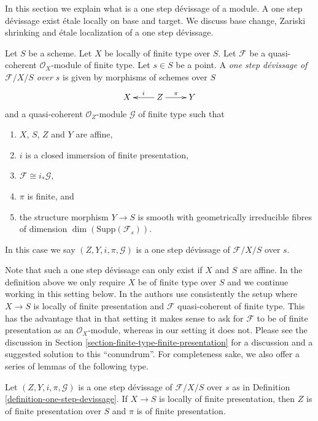 \noindent
In this section we explain what is a one step d\'evissage of a
module. A one step d\'evissage exist \'etale locally on base and target.
We discuss base change, Zariski shrinking and \'etale localization of
a one step d\'evissage.

\begin{definition}
\label{definition-one-step-devissage}
Let $S$ be a scheme.
Let $X$ be locally of finite type over $S$.
Let $\mathcal{F}$ be a quasi-coherent $\mathcal{O}_X$-module of finite type.
Let $s \in S$ be a point.
A {\it one step d\'evissage of $\mathcal{F}/X/S$ over $s$}
is given by morphisms of schemes over $S$
$$
\xymatrix{
X & Z \ar[l]_i \ar[r]^\pi & Y
}
$$
and a quasi-coherent $\mathcal{O}_Z$-module $\mathcal{G}$ of finite type
such that
\begin{enumerate}
\item $X$, $S$, $Z$ and $Y$ are affine,
\item $i$ is a closed immersion of finite presentation,
\item $\mathcal{F} \cong i_*\mathcal{G}$,
\item $\pi$ is finite, and
\item the structure morphism $Y \to S$ is smooth with
geometrically irreducible fibres of
dimension $\dim(\text{Supp}(\mathcal{F}_s))$.
\end{enumerate}
In this case we say $(Z, Y, i, \pi, \mathcal{G})$ is a one step
d\'evissage of $\mathcal{F}/X/S$ over $s$.
\end{definition}

\noindent
Note that such a one step d\'evissage can only exist if $X$ and $S$
are affine. In the definition above we only require $X$ be of finite
type over $S$ and we continue working in this setting below.
In \cite{GruRay} the authors use consistently the setup where $X \to S$
is locally of finite presentation and $\mathcal{F}$ quasi-coherent
of finite type. This has the advantage that in that setting it makes
sense to ask for $\mathcal{F}$ to be of finite presentation as
an $\mathcal{O}_X$-module, whereas in our setting it does not.
Please see the discussion in
Section \ref{section-finite-type-finite-presentation}
for a discussion and a suggested solution to this ``conundrum''. For
completeness sake, we also offer a series of lemmas of the following
type.

\begin{lemma}
\label{lemma-one-step-finite-presentation}
Let $(Z, Y, i, \pi, \mathcal{G})$ is a one step
d\'evissage of $\mathcal{F}/X/S$ over $s$ as in
Definition \ref{definition-one-step-devissage}.
If $X \to S$ is locally of finite presentation, then
$Z$ is of finite presentation over $S$ and $\pi$ is of
finite presentation.
\end{lemma}


